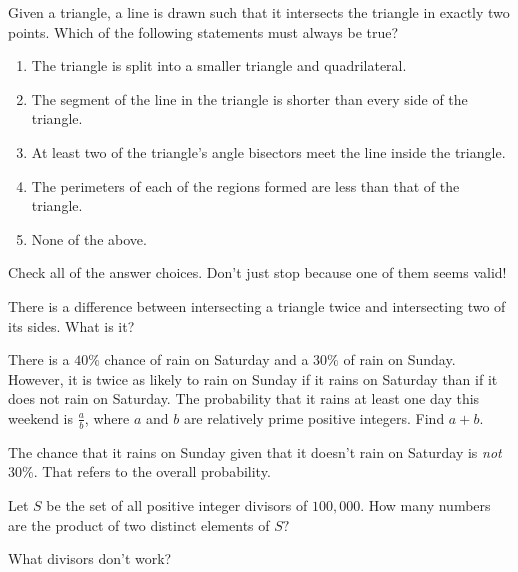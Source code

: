\documentclass[mast]{lucky}
\begin{document}
\begin{prob}[DMC 10C 2021/11]
    Given a triangle, a line is drawn such that it intersects the triangle in exactly two points. Which of the following statements must always be true?
\begin{enumerate}
    \item The triangle is split into a smaller triangle and quadrilateral.
    \item The segment of the line in the triangle is shorter than every side of the triangle.
    \item At least two of the triangle's angle bisectors meet the line inside the triangle.
    \item The perimeters of each of the regions formed are less than that of the triangle.
    \item None of the above.
\end{enumerate}
\begin{mistakes}
    \begin{mistake}
        Check all of the answer choices. Don't just stop because one of them seems valid!
    \end{mistake}
    \begin{mistake}
        There is a difference between intersecting a triangle twice and intersecting two of its sides. What is it?
    \end{mistake}
\end{mistakes}
\end{prob}

\begin{prob}[AIME II 2016/2]{4}
There is a $40\%$ chance of rain on Saturday and a $30\%$ of rain on Sunday. However, it is twice as likely to rain on Sunday if it rains on Saturday than if it does not rain on Saturday. The probability that it rains at least one day this weekend is $\frac{a}{b}$, where $a$ and $b$ are relatively prime positive integers. Find $a+b$.
\begin{mistakes}
    \begin{mistake}
        The chance that it rains on Sunday given that it doesn't rain on Saturday is \emph{not} $30\%.$ That refers to the overall probability.
    \end{mistake}
\end{mistakes}
\end{prob}

\begin{prob}[AMC 12B 2019/14]{4}
Let $S$ be the set of all positive integer divisors of $100,000.$ How many numbers are the product of two distinct elements of $S?$
\begin{mistakes}
    \begin{mistake}
        What divisors don't work?
    \end{mistake}
\end{mistakes}
\end{prob}
\end{document}
